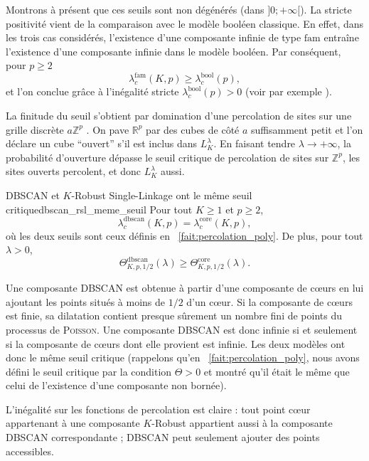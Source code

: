 \begin{Preuve}
Montrons à présent que ces seuils sont non dégénérés (dans $]0 ; + \infty[$). La stricte positivité vient de la comparaison avec le modèle booléen classique. En effet, dans les trois cas considérés, l'existence d'une composante infinie de type $\mathrm{fam}$ entraîne l'existence d'une composante infinie dans le modèle booléen. Par conséquent, pour $p\ge 2$
\[
\lambda^{\mathrm{fam}}_{c}(K,p)
\geq
\lambda^{\mathrm{bool}}_{c}(p),
\]
et l'on conclue grâce à l'inégalité stricte $\lambda^{\mathrm{bool}}_{c}(p)>0$ (voir par exemple \cite{penrose2003,MeesterRoy}).

La finitude du seuil s'obtient par domination d'une percolation de sites \cite{Percolation2006} sur une grille discrète $a \mathbb Z^p$ . On pave $\mathbb R^p$ par des cubes de côté $a$ suffisamment petit et l’on déclare un cube ``ouvert'' s'il est inclus dans $L_K^\lambda$. En faisant tendre $\lambda \to +\infty$, la probabilité d’ouverture dépasse le seuil critique de percolation de sites sur $\mathbb Z^p$, les sites ouverts percolent, et donc $L_K^\lambda$ aussi.

\end{Preuve}

\begin{Fait}{DBSCAN et $K$-Robust Single-Linkage ont le même seuil critique}{dbscan_rsl_meme_seuil}
Pour tout $K\geq 1$ et $p\geq 2$,
\[
\boxed{
\lambda^{\mathrm{dbscan}}_{c}(K,p)
=
\lambda^{\mathrm{core}}_{c}(K,p),
}
\]
où les deux seuils sont ceux définis en \Fact~\ref{fait:percolation_poly}. 
De plus, pour tout $\lambda>0$,
\[
\Theta^{\mathrm{dbscan}}_{K,p,1/2}(\lambda)
\geq
\Theta^{\mathrm{core}}_{K,p,1/2}(\lambda).
\]
\end{Fait}

\begin{Preuve}
Une composante DBSCAN est obtenue à partir d'une composante de cœurs en lui ajoutant les points situés à moins de $1/2$ d'un cœur. Si la composante de cœurs est finie, sa dilatation contient presque sûrement un nombre fini de points du processus de \textsc{Poisson}. Une composante DBSCAN est donc infinie si et seulement si la composante de cœurs dont elle provient est infinie. Les deux modèles ont donc le même seuil critique (rappelons qu'en \Fact~\ref{fait:percolation_poly}, nous avons défini le seuil critique par la condition $\Theta>0$ et montré qu'il était le même que celui de l'existence d'une composante non bornée).

L'inégalité sur les fonctions de percolation est claire : tout point cœur appartenant à une composante $K$-Robust appartient aussi à la composante DBSCAN correspondante ; DBSCAN peut seulement ajouter des points accessibles.
\end{Preuve}


